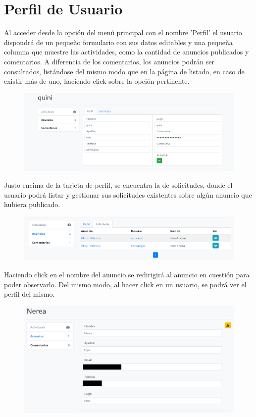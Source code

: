 \section{Perfil de Usuario}

Al acceder desde la opci\'{o}n del men\'{u} principal con el nombre 'Perfil' el usuario dispondr\'{a} de un peque\~{n}o formulario con sus datos editables y una peque\~{n}a columna que muestre las actividades, como la cantidad de anuncios publicados y comentarios. A diferencia de los comentarios, los anuncios podr\'{a}n  ser consultados, list\'{a}ndose del mismo modo que en la p\'{a}gina de listado, en caso de existir m\'{a}s de uno, haciendo click sobre la opci\'{o}n pertinente. 


\begin{figure}[h!]
\centering
\includegraphics[width=1\textwidth]{Img/ManualUsuario/USER_PROFILE_EDIT.png}
\end{figure}

Justo encima de la tarjeta de perfil, se encuentra la de solicitudes, donde el usuario podr\'{a} listar y gestionar sus solicitudes existentes sobre alg\'{u}n anuncio que hubiera publicado.

\begin{figure}[h!]
\centering
\includegraphics[width=.7\textwidth]{Img/ManualUsuario/USER_REQUESTS.png}
\end{figure}

Haciendo click en el nombre del anuncio se redirigir\'{a} al anuncio en cuesti\'{o}n para poder observarlo. Del mismo modo, al hacer click en un usuario, se podr\'{a} ver el perfil del mismo.


\begin{figure}[h!]
\centering
\includegraphics[width=.8\textwidth]{Img/ManualUsuario/PERFIL_OTHER.png}
\end{figure}

